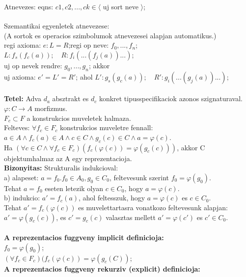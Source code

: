 \documentclass[a4paper,10pt]{article}
\begin{document}
Atnevezes: eqns: $c1, c2, ..., ck \in \langle$ uj sort neve $\rangle$;\\ \\
Szemantikai egyenletek atnevezese:\\
(A sortok es operacios szimbolumok atnevezesei alapjan automatikus.)\\
regi axioma: $e: L = R$;\indent regi op neve: $f_0, ..., f_n$;\\
$L: f_s(f_c(a)); \quad R: f_i(...(f_j(a))...)$;\\
uj op nevek rendre: $g_0, ..., g_n$; akkor\\
uj axioma: $e'=L'=R'$; ahol $L': g_s(g_c(a));\quad R':g_i(...(g_j(a))...)$;\\ \\
\textbf{Tetel:} Adva $d_a$ absztrakt es $d_c$ konkret tipusspecifikaciok azonos szignaturaval.\\
$\varphi: C\to A$ morfizmus.\\
$F_c \subset F$ a konstrukcios muveletek halmaza.\\
Felteves: $\forall f_c \in F_c$ konstrukcios muveletre fennall:\\
\indent $a\in A \wedge f_c(a)\in A \wedge c\in C \wedge g_c(c)\in C \wedge a=\varphi(c)$.\\
Ha $(\forall c \in C \wedge \forall f_c\in F_c)(f_c(\varphi(c))=\varphi(g_c(c)))$, akkor C objektumhalmaz az A egy reprezentacioja.\\
\textbf{Bizonyitas:} Strukturalis indukcioval:\\
a) alapeset: $a=f_0. f_0\in A_0, g_0\in C_0$, feltevesunk szerint $f_0=\varphi(g_0)$.\\
Tehat $a=f_0$ eseten letezik olyan $c\in C_0$, hogy $a=\varphi(c)$.\\
b) indukcio: $a'=f_c(a)$, ahol feltesszuk, hogy $a=\varphi(c)$ es $c\in C_0$.\\
Tehat $a'=f_c(\varphi(c))$ es muvelettartasra vonatkozo feltevesunk alapjan:\\
$a'=\varphi(g_c(c))$, es $c'=g_c(c)$ valasztas mellett $a'=\varphi(c')$ es $c'\in C_0$.\\ \\
\textbf{A reprezentacios fuggveny implicit definicioja:}\\
$f_0=\varphi(g_0)$;\\
$(\forall f_c\in F_c)(f_c(\varphi(c))=\varphi(g_c(C))$;\\
\textbf{A reprezentacios fuggveny rekurziv (explicit) definicioja:}\\
\end{document}
